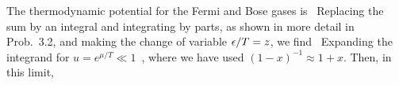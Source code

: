 {	The thermodynamic potential for the Fermi and Bose gases is~\cite[pp.~145--146]{Landau}
	Replacing the sum by an integral and integrating by parts, as shown in more detail in Prob.~{3.2}, and making the change of variable $\epsilon / T = z$, we find~\cite[p.~149]{Landau}
	Expanding the integrand for $u = e^{\mu / T} \ll 1$~\cite[p.~151]{Landau},
	where we have used $(1 - x)^{-1} \approx 1 + x.$  Then, in this limit,
	
}
